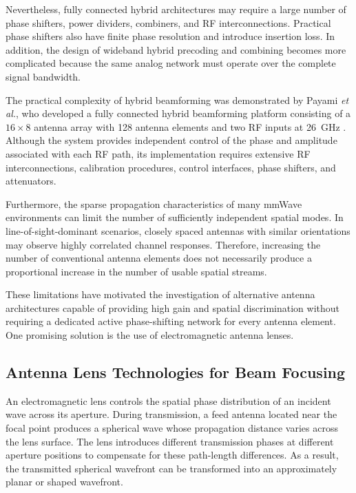 Nevertheless, fully connected hybrid architectures may require a
large number of phase shifters, power dividers, combiners, and RF
interconnections. Practical phase shifters also have finite phase
resolution and introduce insertion loss. In addition, the design of
wideband hybrid precoding and combining becomes more complicated
because the same analog network must operate over the complete signal
bandwidth.

The practical complexity of hybrid beamforming was demonstrated by
Payami \textit{et al.}, who developed a fully connected hybrid
beamforming platform consisting of a $16\times8$ antenna array with
128 antenna elements and two RF inputs at 26~GHz
\cite{Payami2020}. Although the system provides independent
control of the phase and amplitude associated with each RF path, its
implementation requires extensive RF interconnections, calibration
procedures, control interfaces, phase shifters, and attenuators.

Furthermore, the sparse propagation characteristics of many mmWave
environments can limit the number of sufficiently independent spatial
modes. In line-of-sight-dominant scenarios, closely spaced antennas
with similar orientations may observe highly correlated channel
responses. Therefore, increasing the number of conventional antenna
elements does not necessarily produce a proportional increase in the
number of usable spatial streams.

These limitations have motivated the investigation of alternative
antenna architectures capable of providing high gain and spatial
discrimination without requiring a dedicated active phase-shifting
network for every antenna element. One promising solution is the use
of electromagnetic antenna lenses.


\subsection{Antenna Lens Technologies for Beam Focusing}
\label{subsec:antenna_lens_technologies}

An electromagnetic lens controls the spatial phase distribution of an
incident wave across its aperture. During transmission, a feed antenna
located near the focal point produces a spherical wave whose
propagation distance varies across the lens surface. The lens
introduces different transmission phases at different aperture
positions to compensate for these path-length differences. As a
result, the transmitted spherical wavefront can be transformed into
an approximately planar or shaped wavefront.

